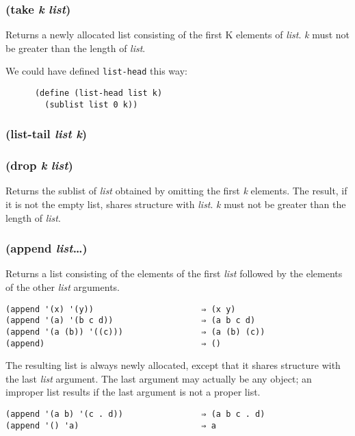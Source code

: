 \documentclass{article}
\begin{document}
\subsubsection{(take \emph{k} \emph{list})}

Returns a newly allocated list consisting of the first K elements of \emph{list}. \emph{k}
must not be greater than the length of \emph{list}.

We could have defined \verb|list-head| this way:

\begin{verbatim}
      (define (list-head list k)
        (sublist list 0 k))
\end{verbatim}

\subsubsection{(list-tail \emph{list} \emph{k})}

\subsubsection{(drop \emph{k} \emph{list})}

Returns the sublist of \emph{list} obtained by omitting the first \emph{k} elements. The
result, if it is not the empty list, shares structure with \emph{list}. \emph{k} must not be
greater than the length of \emph{list}.

\subsubsection{(append \emph{list}\ldots{})}

Returns a list consisting of the elements of the first \emph{list} followed by the elements of
the other \emph{list} arguments.

\begin{verbatim}
(append '(x) '(y))                      ⇒ (x y)
(append '(a) '(b c d))                  ⇒ (a b c d)
(append '(a (b)) '((c)))                ⇒ (a (b) (c))
(append)                                ⇒ ()
\end{verbatim}

The resulting list is always newly allocated, except that it shares structure with the last
\emph{list} argument. The last argument may actually be any object; an improper list results
if the last argument is not a proper list.

\begin{verbatim}
(append '(a b) '(c . d))                ⇒ (a b c . d)
(append '() 'a)                         ⇒ a
\end{verbatim}
\end{document}
